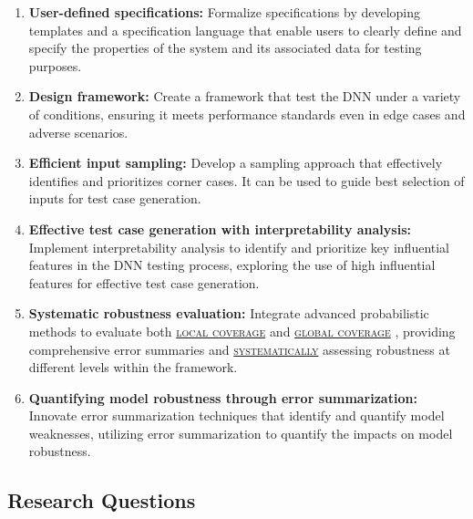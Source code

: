 \begin{enumerate}
    \item \textbf{ User-defined specifications:} Formalize specifications by developing templates and a specification language that enable users to clearly define and specify the properties of the system and its associated data for testing purposes.
    \item \textbf{Design framework:} Create a framework that test the DNN under a variety of conditions, ensuring it meets performance standards even in edge cases and adverse scenarios.
    
    \item \textbf{Efficient input sampling:} Develop a sampling approach that effectively identifies and prioritizes corner cases. It can be used to guide best selection of inputs for test case generation.
  
    \item \textbf{Effective test case generation with interpretability analysis:} Implement interpretability analysis to identify and prioritize key influential features in the DNN testing process, exploring the use of high influential features for effective test case generation.
    
    \item \textbf{Systematic robustness evaluation:} Integrate advanced probabilistic methods to evaluate both \hyperref[gloss]{\textsc{\textsc{local coverage}}} \label{Local coverage}  and \hyperref[gloss]{\textsc{\textsc{global coverage}}} \label{Global coverage}, providing comprehensive error summaries and \hyperref[gloss]{\textsc{systematically}} \label{systematic}  assessing robustness at different levels within the framework.
    
    \item \textbf{Quantifying model robustness through error summarization:} Innovate error summarization techniques that identify and quantify model weaknesses, utilizing error summarization to quantify the impacts on model robustness.
\end{enumerate}

\subsection{Research Questions}

